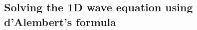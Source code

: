 \documentclass{article}
\newcommand{\red}[1]{\textcolor{red}{#1}}
\begin{document}
\subsection{Solving the 1D wave equation using d'Alembert's formula}
\begin{bibdiv}
\begin{biblist}
\end{biblist}
\end{bibdiv}
\end{document}
